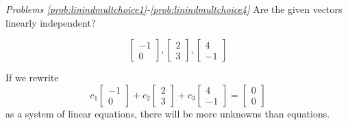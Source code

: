 \documentclass{ximera}
\begin{document}
\begin{problem}
\begin{enumerate}
\begin{multipleChoice}
 \end{multipleChoice}
    
\end{enumerate}
\end{problem}



\emph{Problems \ref{prob:linindmultchoice1}-\ref{prob:linindmultchoice4}}
 Are the given vectors linearly independent?

\begin{problem}\label{prob:linindmultchoice1}
$$\begin{bmatrix}-1\\0\end{bmatrix}, \begin{bmatrix}2\\3\end{bmatrix},\begin{bmatrix}4\\-1\end{bmatrix}$$

\begin{multipleChoice}
 \end{multipleChoice}
 \begin{hint}
 If we rewrite $$c_1\begin{bmatrix}-1\\0\end{bmatrix}+c_2 \begin{bmatrix}2\\3\end{bmatrix}+c_3\begin{bmatrix}4\\-1\end{bmatrix}=\begin{bmatrix}0\\0\end{bmatrix}$$ as a system of linear equations, there will be more unknowns than equations.
 \end{hint}
\end{problem}
\end{document}
